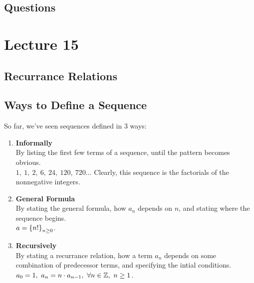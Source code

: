 \documentclass{report}
\begin{document}
\subsection*{Questions}
\qs{}{}

\newpage
\section{Lecture 15}
\subsection*{Recurrance Relations}

\subsection*{Ways to Define a Sequence}
So far, we've seen sequences defined in 3 ways:
\begin{enumerate}
	\item \textbf{Informally} \\ By listing the first few terms of a sequence, until the pattern becomes obvious. \\ $1,\ 1,\ 2,\ 6,\ 24,\ 120,\ 720\dots$ Clearly, this sequence is the factorials of the nonnegative integers.
	\item \textbf{General Formula} \\ By stating the general formula, how $a_n$ depends on $n$, and stating where the sequence begins. \\ $a = \left\lbrace n! \right\rbrace_{n\geq0}$.
	\item \textbf{Recursively} \\ By stating a recurrance relation, how a term $a_n$ depends on some combination of predecessor terms, and specifying the intial conditions. \\ $a_0 = 1,\ a_n = n \cdot a_{n-1},\ \forall n\in\mathbb{Z},\ n\geq1$.
\end{enumerate}
\end{document}
